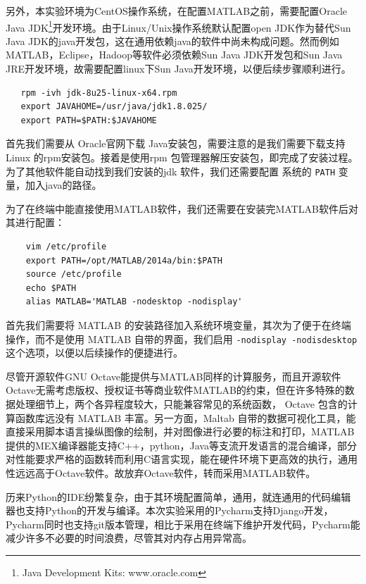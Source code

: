 \documentclass[oneside]{ZJUthesis}
\begin{document}
另外，本实验环境为CentOS操作系统，在配置MATLAB之前，需要配置Oracle Java JDK\footnote{Java Development Kits: www.oracle.com}开发环境。由于Linux/Unix操作系统默认配置open JDK作为替代Sun Java JDK的java开发包，这在通用依赖java的软件中尚未构成问题。然而例如MATLAB，Eclipse，Hadoop等软件必须依赖Sun Java JDK开发包和Sun Java JRE开发环境，故需要配置linux下Sun Java开发环境，以便后续步骤顺利进行。
\begin{verbatim}
   rpm -ivh jdk-8u25-linux-x64.rpm         
   export JAVAHOME=/usr/java/jdk1.8.025/  
   export PATH=$PATH:$JAVAHOME
\end{verbatim}
首先我们需要从 Oracle官网下载 Java安装包，需要注意的是我们需要下载支持 Linux 的rpm安装包。接着是使用rpm 包管理器解压安装包，即完成了安装过程。为了其他软件能自动找到我们安装的jdk 软件，我们还需要配置 系统的 \texttt{PATH} 变量，加入java的路径。


为了在终端中能直接使用MATLAB软件，我们还需要在安装完MATLAB软件后对其进行配置：
\begin{verbatim}
    vim /etc/profile
    export PATH=/opt/MATLAB/2014a/bin:$PATH
    source /etc/profile
    echo $PATH
    alias MATLAB='MATLAB -nodesktop -nodisplay'
\end{verbatim}
首先我们需要将 MATLAB 的安装路径加入系统环境变量，其次为了便于在终端操作，而不是使用 MATLAB 自带的界面，我们启用 \texttt{-nodisplay -nodisdesktop}这个选项，以便以后续操作的便捷进行。


尽管开源软件GNU Octave能提供与MATLAB同样的计算服务，而且开源软件Octave无需考虑版权、授权证书等商业软件MATLAB的约束，但在许多特殊的数据处理细节上，两个各异程度较大，只能兼容常见的系统函数， Octave 包含的计算函数库远没有 MATLAB 丰富。另一方面，Maltab 自带的数据可视化工具，能直接采用脚本语言操纵图像的绘制，并对图像进行必要的标注和打印，MATLAB提供的MEX编译器能支持C++，python，Java等支流开发语言的混合编译，部分对性能要求严格的函数转而利用C语言实现，能在硬件环境下更高效的执行，通用性远远高于Octave软件。故放弃Octave软件，转而采用MATLAB软件。

历来Python的IDE纷繁复杂，由于其环境配置简单，通用，就连通用的代码编辑器也支持Python的开发与编译。本次实验采用的Pycharm支持Django开发，Pycharm同时也支持git版本管理，相比于采用在终端下维护开发代码，Pycharm能减少许多不必要的时间浪费，尽管其对内存占用异常高。
\end{document}
